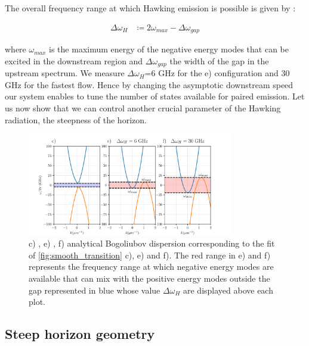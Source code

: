 The overall frequency range at which Hawking emission is possible is given by :

\begin{equation}
    \begin{align}
    \Delta \omega_H& \coloneqq  2\omega_{max}- \Delta\omega_{gap}
    \end{align}  
    \label{eq:hawking_range}
\end{equation}

where $\omega_{max}$ is the maximum energy of the negative energy modes that can be excited in the downstream region and $\Delta\omega_{gap}$ the width 
of the gap in the upstream spectrum. We measure $\Delta \omega_H$=6 GHz for the e) configuration and 30 GHz for the fastest flow. 
Hence by changing the asymptotic downstream speed our system enables to tune the number of states available for paired emission. Let us now 
show that we can control another crucial parameter of the Hawking radiation, the steepness of the horizon.

\begin{figure}
    \centering
    \includegraphics[width=0.8\textwidth]{chap_custom_st/fig/max_freq_hawking.pdf}
    \caption{c) , e) , f) analytical Bogoliubov dispersion corresponding to the fit of \autoref{fig:smooth_transition} c), e) and f). The red range in e) and f) represents the frequency range at which negative energy modes
    are available that can mix with the positive energy modes outside the gap represented in blue whose value $\Delta \omega_H$ are displayed above each plot.}
    \label{fig:hawking_range}
\end{figure}

\subsection{Steep horizon geometry}

